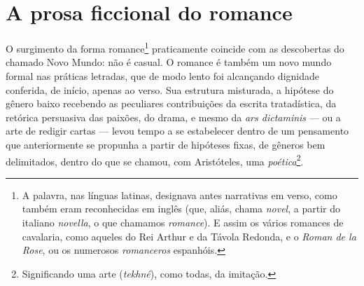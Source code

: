 

\section{A prosa ficcional do romance}

O surgimento da forma romance\footnote{A palavra, nas línguas latinas,
  designava antes narrativas em verso, como também eram reconhecidas em
  inglês (que, aliás, chama \emph{novel}, a partir do italiano
  \emph{novella}, o que chamamos \emph{romance}). E assim os vários
  romances de cavalaria, como aqueles do Rei Arthur e da Távola Redonda,
  e o \emph{Roman de la Rose}, ou os numerosos \emph{romanceros}
  espanhóis.} praticamente coincide com as descobertas do chamado Novo
Mundo: não é casual. O romance é também um novo mundo formal nas
práticas letradas, que de modo lento foi alcançando dignidade conferida,
de início, apenas ao verso. Sua estrutura misturada, a hipótese do
gênero baixo recebendo as peculiares contribuições da escrita
tratadística, da retórica persuasiva das paixões, do drama, e mesmo da
\emph{ars dictaminis} --- ou a arte de redigir cartas --- levou tempo a
se estabelecer dentro de um pensamento que anteriormente se propunha a
partir de hipóteses fixas, de gêneros bem delimitados, dentro do que se
chamou, com Aristóteles, uma \emph{poética}\footnote{Significando uma
  arte (\emph{tekhné}), como todas, da imitação.}.

